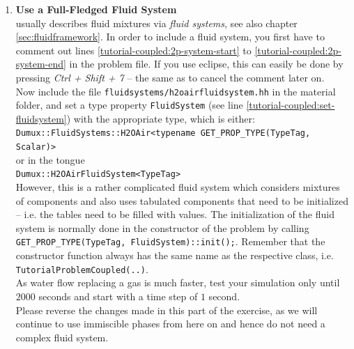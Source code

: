 \begin{enumerate}
\item \textbf{Use a Full-Fledged Fluid System} \\
\Dumux usually describes fluid mixtures via \textit{fluid systems}, see also chapter \ref{sec:fluidframework}. 
In order to include a fluid system, you first have to comment out lines \ref{tutorial-coupled:2p-system-start} 
to \ref{tutorial-coupled:2p-system-end} in the problem file. If you use eclipse, this can easily be done by pressing \textit{Ctrl + Shift + 7} -- 
the same as to cancel the comment later on.\\
Now include the file \texttt{fluidsystems/h2oairfluidsystem.hh} in the material folder, and set a type property \texttt{FluidSystem} (see line \ref{tutorial-coupled:set-fluidsystem})
with the appropriate type, which is either:\\
 \texttt{Dumux::FluidSystems::H2OAir<typename GET\_PROP\_TYPE(TypeTag, Scalar)>}\\
or in the \Dumux tongue\\
 \texttt{Dumux::H2OAirFluidSystem<TypeTag>}
\\
However, this is a rather complicated fluid system which 
considers mixtures of components and also uses tabulated components that need to be initialized -- i.e. the tables need to be filled with values. 
The initialization of the fluid system is normally done in the constructor of the problem by calling \texttt{GET\_PROP\_TYPE(TypeTag, FluidSystem)::init();}. 
Remember that the constructor function always has the same name as the respective class, i.e. \texttt{TutorialProblemCoupled(..)}.\\
As water flow replacing a gas is much faster, test your simulation only until $2000$ seconds and start with a time step of $1$ second.\\
Please reverse the changes made in this part of the exercise, as we will continue to use immiscible phases from here on and hence do not need a complex fluid system.


\end{enumerate}
